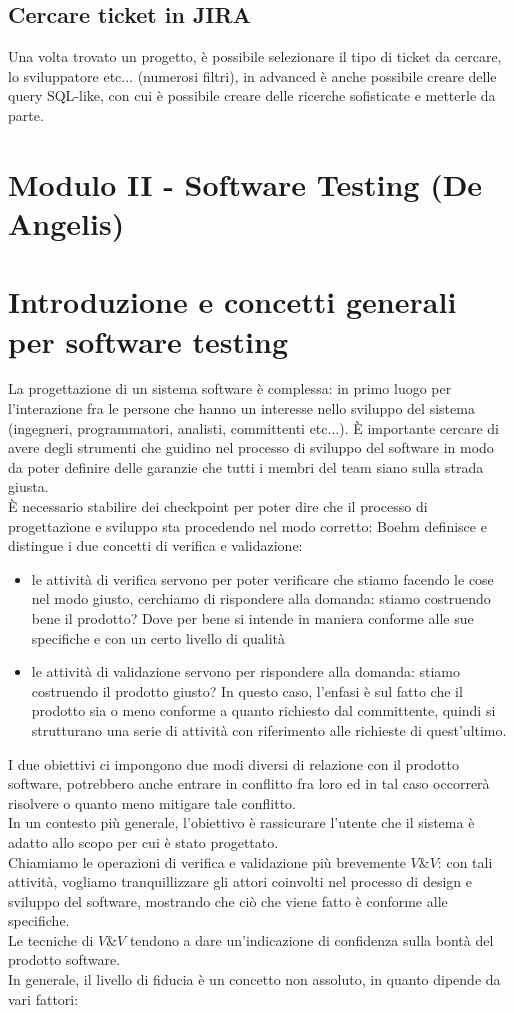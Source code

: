 \documentclass{article}
\begin{document}
\subsection{Cercare ticket in JIRA}
Una volta trovato un progetto, è possibile selezionare il tipo di ticket da cercare, lo sviluppatore etc... (numerosi filtri), in advanced è anche possibile creare delle query SQL-like, con cui è possibile creare delle ricerche sofisticate e metterle da parte.
\newpage
\section{Modulo II - Software Testing (De Angelis)}
\section{Introduzione e concetti generali per software testing}
La progettazione di un sistema software è complessa: in primo luogo per l'interazione fra le persone che hanno un interesse nello sviluppo del sistema (ingegneri, programmatori, analisti, committenti etc...). È importante cercare di avere degli strumenti che guidino nel processo di sviluppo del software in modo da poter definire delle garanzie che tutti i membri del team siano sulla strada giusta.\\È necessario stabilire dei checkpoint per poter dire che il processo di progettazione e sviluppo sta procedendo nel modo corretto: Boehm definisce e distingue i due concetti di verifica e validazione:
\begin{itemize}
\item le attività di verifica servono per poter verificare che stiamo facendo le cose nel modo giusto, cerchiamo di rispondere alla domanda: stiamo costruendo bene il prodotto? Dove per bene si intende in maniera conforme alle sue specifiche e con un certo livello di qualità
\item le attività di validazione servono per rispondere alla domanda: stiamo costruendo il prodotto giusto? In questo caso, l'enfasi è sul fatto che il prodotto sia o meno conforme a quanto richiesto dal committente, quindi si strutturano una serie di attività con riferimento alle richieste di quest'ultimo.
\end{itemize}
I due obiettivi ci impongono due modi diversi di relazione con il prodotto software, potrebbero anche entrare in conflitto fra loro ed in tal caso occorrerà risolvere o quanto meno mitigare tale conflitto.\\ In un contesto più generale, l'obiettivo è rassicurare l'utente che il sistema è adatto allo scopo per cui è stato progettato.\\ Chiamiamo le operazioni di verifica e validazione più brevemente $V\&V$: con tali attività, vogliamo tranquillizzare gli attori coinvolti nel processo di design e sviluppo del software, mostrando che ciò che viene fatto è conforme alle specifiche.\\Le tecniche di $V\&V$ tendono a dare un'indicazione di confidenza sulla bontà del prodotto software.\\ In generale, il livello di fiducia è un concetto non assoluto, in quanto dipende da vari fattori:
\end{document}
